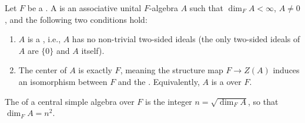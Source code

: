 \begin{definition} \label{definition:central_simple_algebra_over_a_field}
    Let $F$ be a . A  is an associative unital $F$-algebra $A$ such that $\dim_F A < \infty$, $A \neq 0$, and the following two conditions hold:
    \begin{enumerate}
        \item $A$ is a , i.e., $A$ has no non-trivial two-sided ideals (the only two-sided ideals of $A$ are $\{0\}$ and $A$ itself).
        \item The center of $A$ is exactly $F$, meaning the structure map $F \to Z(A)$ induces an isomorphism between $F$ and the . Equivalently, $A$ is a  over $F$.
    \end{enumerate}

    The  of a central simple algebra over $F$ is the integer $n = \sqrt{\dim_F A}$, so that $\dim_F A = n^2$.
\end{definition}
